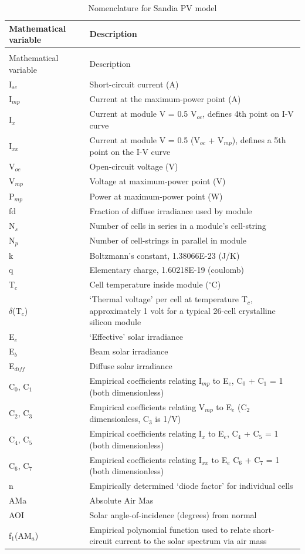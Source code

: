 \begin{longtable}[c]{p{1.2in}p{4.8in}}
\caption{Nomenclature for Sandia PV model \label{table:nomenclature-for-sandia-pv-model}} \tabularnewline
\toprule 
Mathematical variable & Description \tabularnewline
\midrule
\endfirsthead

\caption[]{Nomenclature for Sandia PV model} \tabularnewline
\toprule 
Mathematical variable & Description \tabularnewline
\midrule
\endhead

I\(_{sc}\) & Short-circuit current (A) \tabularnewline
I\(_{mp}\) & Current at the maximum-power point (A) \tabularnewline
I\(_{x}\) & Current at module V = 0.5 V\(_{oc}\), defines 4th point on I-V curve \tabularnewline
I\(_{xx}\) & Current at module V = 0.5 (V\(_{oc}\) + V\(_{mp}\)), defines a 5th point on the I-V curve \tabularnewline
V\(_{oc}\) & Open-circuit voltage (V) \tabularnewline
V\(_{mp}\) & Voltage at maximum-power point (V) \tabularnewline
P\(_{mp}\) & Power at maximum-power point (W) \tabularnewline
fd & Fraction of diffuse irradiance used by module \tabularnewline
N\(_{s}\) & Number of cells in series in a module’s cell-string \tabularnewline
N\(_{p}\) & Number of cell-strings in parallel in module \tabularnewline
k & Boltzmann’s constant, 1.38066E-23 (J/K) \tabularnewline
q & Elementary charge, 1.60218E-19 (coulomb) \tabularnewline
T\(_{c}\) & Cell temperature inside module (\(^{\circ}\)C) \tabularnewline
$\delta$(T\(_{c}\)) & ‘Thermal voltage’ per cell at temperature T\(_{c}\), approximately 1 volt for a typical 26-cell crystalline silicon module \tabularnewline
E\(_{e}\) & ‘Effective’ solar irradiance \tabularnewline
E\(_{b}\) & Beam solar irradiance \tabularnewline
E\(_{diff}\) & Diffuse solar irradiance \tabularnewline
C\(_{0}\), C\(_{1}\) & Empirical coefficients relating I\(_{mp}\) to E\(_{e}\), C\(_{0}\) + C\(_{1}\) = 1 (both dimensionless) \tabularnewline
C\(_{2}\), C\(_{3}\) & Empirical coefficients relating V\(_{mp}\) to E\(_{e}\) (C\(_{2}\) dimensionless, C\(_{3}\) is 1/V) \tabularnewline
C\(_{4}\), C\(_{5}\) & Empirical coefficients relating I\(_{x}\) to E\(_{e}\), C\(_{4}\) + C\(_{5}\) = 1 (both dimensionless) \tabularnewline
C\(_{6}\), C\(_{7}\) & Empirical coefficients relating I\(_{xx}\) to E\(_{e}\) C\(_{6}\) + C\(_{7}\) = 1 (both dimensionless) \tabularnewline
n & Empirically determined ‘diode factor’ for individual cells \tabularnewline
AMa & Absolute Air Mas \tabularnewline
AOI & Solar angle-of-incidence (degrees) from normal \tabularnewline
f\(_{1}\)(AM\(_{a}\)) & Empirical polynomial function used to relate short-circuit current to the solar spectrum via air mass \tabularnewline

\end{longtable}
